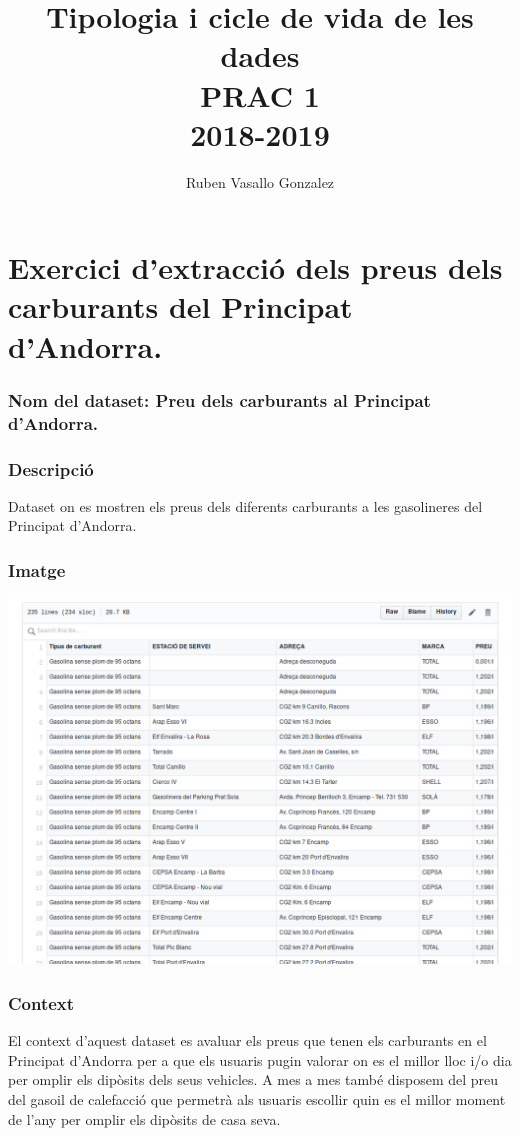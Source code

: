 \documentclass[10pt,a4paper]{article}
\author{Ruben Vasallo Gonzalez}
\title{Tipologia i cicle de vida de les dades \\ PRAC 1 \\ 2018-2019}
\begin{document}
\maketitle

\part*{Exercici d'extracció dels preus dels carburants del Principat d'Andorra.}

\section{Nom del dataset: Preu dels carburants al Principat d'Andorra.}

\section{Descripció}
Dataset on es mostren els preus dels diferents carburants a les gasolineres del Principat d'Andorra.

\section{Imatge}
\includegraphics[width=16cm]{datset-image.png}

\section{Context}
El context d'aquest dataset es avaluar els preus que tenen els carburants en el Principat d'Andorra per a que els usuaris pugin valorar on es el millor lloc i/o dia per omplir els dipòsits dels seus vehicles. A mes a mes també disposem del preu del gasoil de calefacció que permetrà als usuaris escollir quin es el millor moment de l'any per omplir els dipòsits de casa seva.
\end{document}
